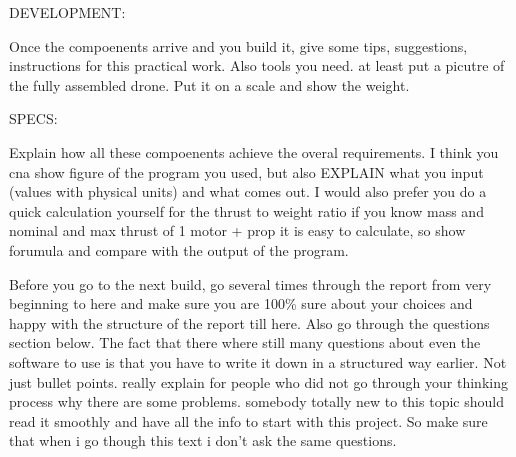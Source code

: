 DEVELOPMENT:

Once the compoenents arrive and you build it, give some tips, suggestions, instructions for this practical work. Also tools you need. at least put a picutre of the fully assembled drone. Put it on a scale and show the weight.

SPECS:

Explain how all these compoenents achieve the overal requirements. I think you cna show figure of the program you used, but also EXPLAIN what you input (values with physical units) and what comes out. I would also prefer you do a quick calculation yourself for the thrust to weight ratio if you know mass and nominal and max thrust of 1 motor + prop it is easy to calculate, so show forumula and compare with the output of the program.


Before you go to the next build, go several times through the report from very beginning to here and make sure you are 100\% sure about your choices and happy with the structure of the report till here. Also go through the questions section below. The fact that there where still many questions about even the software to use is that you have to write it down in a structured way earlier. Not just bullet points. really explain for people who did not go through your thinking process why there are some problems. somebody totally new to this topic should read it smoothly and have all the info to start with this project. So make sure that when i go though this text i don't ask the same questions.
